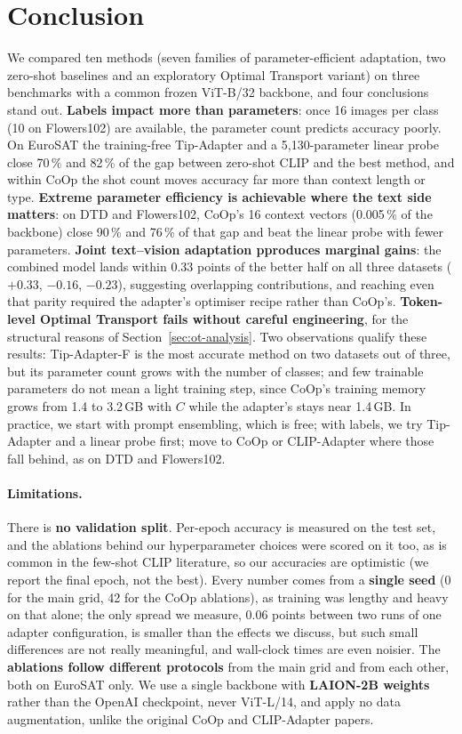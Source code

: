 \documentclass[10pt,twocolumn,letterpaper]{article}
\begin{document}
\section{Conclusion}\label{sec:conclusion}

We compared ten methods (seven families of parameter-efficient
adaptation, two zero-shot baselines and an exploratory Optimal Transport
variant) on three benchmarks with a common frozen ViT-B/32 backbone, and four conclusions stand out. 
\textbf{Labels impact more than parameters}: once 16 images per class (10 on Flowers102) are available, the parameter count predicts accuracy poorly.  On EuroSAT the training-free Tip-Adapter and a 5{,}130-parameter linear probe close 70\,\% and 82\,\% of the gap between
zero-shot CLIP and the best method, and within CoOp the shot count moves
accuracy far more than context length or type. 
\textbf{Extreme parameter efficiency is achievable where the text side matters}: on DTD
and Flowers102, CoOp's 16 context vectors (0.005\,\% of the backbone) close 90\,\% and 76\,\% of that gap and beat the linear probe with fewer parameters.  
\textbf{Joint text--vision adaptation pproduces marginal gains}: the combined model lands within 0.33 points of the better half on all three datasets ($+0.33$, $-0.16$, $-0.23$), suggesting overlapping contributions, and reaching even that parity required the adapter's
optimiser recipe rather than CoOp's.  \textbf{Token-level Optimal Transport fails without careful engineering}, for the structural reasons of Section~\ref{sec:ot-analysis}.  Two observations qualify these results: Tip-Adapter-F is the most accurate method on two datasets out of three, but its parameter count grows with the number of classes; and few
trainable parameters do not mean a light training step, since CoOp's
training memory grows from 1.4 to 3.2\,GB with $C$ while the adapter's
stays near 1.4\,GB. In practice, we start with prompt ensembling, which is
free; with labels, we try Tip-Adapter and a linear probe first; move to CoOp
or CLIP-Adapter where those fall behind, as on DTD and Flowers102.

\paragraph{Limitations.}
There is \textbf{no validation split}. Per-epoch accuracy is measured on
the test set, and the ablations behind our hyperparameter choices were
scored on it too, as is common in the few-shot CLIP literature, so our
accuracies are optimistic (we report the final epoch, not the best).
Every number comes from a \textbf{single seed} (0 for the main grid, 42
for the CoOp ablations), as training was lengthy and heavy on that alone; the only spread we measure, 0.06 points between two runs of one adapter configuration, is smaller than the effects we discuss, but such small differences are not really meaningful, and
wall-clock times are even noisier. The \textbf{ablations follow different protocols} from the main grid and from each other, both on
EuroSAT only.  We use a single backbone with \textbf{LAION-2B weights}
rather than the OpenAI checkpoint, never ViT-L/14, and apply no data
augmentation, unlike the original CoOp and CLIP-Adapter papers.
\end{document}
